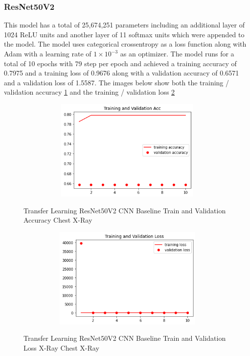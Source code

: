 \subsubsection{ResNet50V2}
This model has a total of 25,674,251 parameters including an additional layer of 1024 ReLU units and another layer of 11 softmax units which were appended to the model.  The model uses categorical crossentropy as a loss function along with Adam with a learning rate of $1 \times 10^{-3}$ as an optimizer.  The model runs for a total of 10 epochs with 79 step per epoch and achieved a training accuracy of 0.7975 and a training loss of 0.9676 along with a validation accuracy of 0.6571 and a validation loss of 1.5587. The images below show both the training / validation accuracy \ref{fig:ResNet50V2 CNN Baseline Train and Validation Accuracy Chest X-Ray} and the training / validation loss \ref{fig:ResNet50V2 CNN Baseline Train and Validation Loss Chest X-Ray}
 \begin{figure}[H]
    \centering
    \includegraphics[width=1\textwidth,height=5cm,keepaspectratio]{Images/ResNet50V2BaselineTrainingValidationAccuracyChestX-Ray.png}\\
    \caption{Transfer Learning ResNet50V2 CNN Baseline Train and Validation Accuracy Chest X-Ray}
    \label{fig:ResNet50V2 CNN Baseline Train and Validation Accuracy Chest X-Ray}
\end{figure}
 \begin{figure}[H]
    \centering
    \includegraphics[width=1\textwidth,height=5cm,keepaspectratio]{Images/ResNet50V2BaselineTrainingValidationLossChestX-Ray.png}\\
    \caption{Transfer Learning ResNet50V2 CNN Baseline Train and Validation Loss X-Ray Chest X-Ray}
    \label{fig:ResNet50V2 CNN Baseline Train and Validation Loss Chest X-Ray}
\end{figure}
